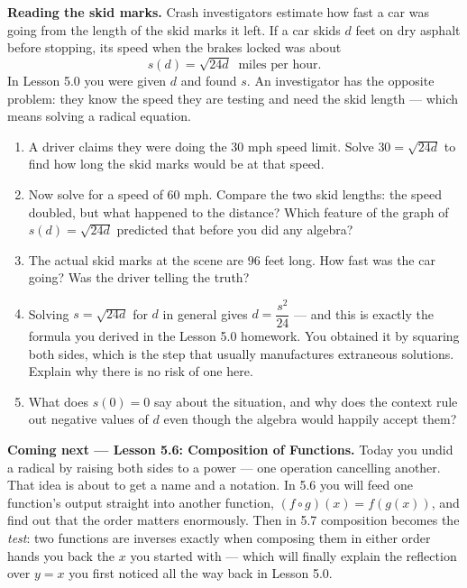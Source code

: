 \documentclass[10pt]{article}
\begin{document}
\begin{extensionbox}
\textbf{Reading the skid marks.} Crash investigators estimate how fast a car was going from the
length of the skid marks it left. If a car skids $d$ feet on dry asphalt before stopping, its speed
when the brakes locked was about
\[
  s(d)=\sqrt{24d} \ \text{ miles per hour.}
\]
In Lesson 5.0 you were given $d$ and found $s$. An investigator has the opposite problem: they know
the speed they are testing and need the skid length --- which means solving a radical equation.
\begin{enumerate}[label=(\alph*), leftmargin=1.8em, itemsep=5pt]
  \item A driver claims they were doing the $30$ mph speed limit. Solve $30=\sqrt{24d}$ to find how
        long the skid marks would be at that speed.
  \item Now solve for a speed of $60$ mph. Compare the two skid lengths: the speed doubled, but what
        happened to the distance? Which feature of the graph of $s(d)=\sqrt{24d}$ predicted that
        before you did any algebra?
  \item The actual skid marks at the scene are $96$ feet long. How fast was the car going? Was the
        driver telling the truth?
  \item Solving $s=\sqrt{24d}$ for $d$ in general gives $d=\dfrac{s^{2}}{24}$ --- and this is exactly
        the formula you derived in the Lesson 5.0 homework. You obtained it by squaring both sides,
        which is the step that usually manufactures extraneous solutions. Explain why there is no
        risk of one here.
  \item What does $s(0)=0$ say about the situation, and why does the context rule out negative
        values of $d$ even though the algebra would happily accept them?
\end{enumerate}
\end{extensionbox}

\begin{spiralbox}
\textbf{Coming next --- Lesson 5.6: Composition of Functions.} Today you undid a radical by raising
both sides to a power --- one operation cancelling another. That idea is about to get a name and a
notation. In 5.6 you will feed one function's output straight into another function,
$(f\circ g)(x)=f(g(x))$, and find out that the order matters enormously. Then in 5.7 composition
becomes the \emph{test}: two functions are inverses exactly when composing them in either order
hands you back the $x$ you started with --- which will finally explain the reflection over $y=x$
you first noticed all the way back in Lesson 5.0.
\end{spiralbox}
\end{document}

